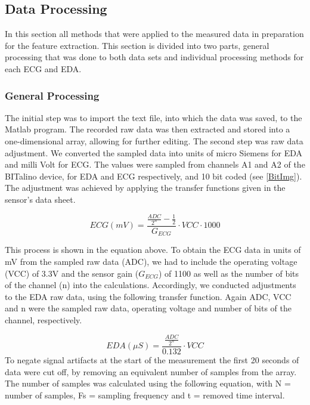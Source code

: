 \subsection{Data Processing}
In this section all methods that were applied to the measured data in preparation for the feature extraction. This section is divided into two parts, general processing that was done to both data sets and individual processing methods for each ECG and EDA.

\subsubsection{General Processing}
The initial step was to import the text file, into which the data was saved, to the Matlab program. The recorded raw data was then extracted and stored into a one-dimensional array, allowing for further editing.
The second step was raw data adjustment. We converted the sampled data into units of micro Siemens for EDA and milli Volt for ECG. The values were sampled from channels A1 and A2 of the BITalino device, for EDA and ECG respectively, and 10 bit coded (see \ref{BitImg}).
The adjustment was achieved by applying the transfer functions given in the sensor's data sheet.

\begin{equation}\label{transfECG}
ECG(mV) = \frac{\frac{ADC}{2^{n}}-\frac{1}{2}}{G_{ECG}} \cdot VCC \cdot 1000 
\end{equation}

This process is shown in the equation above. To obtain the ECG data in units of mV from the sampled raw data (ADC), we had to include the operating voltage (VCC) of 3.3V and the sensor gain ($G_{ECG}$) of 1100 as well as the number of bits of the channel (n) into the calculations.
Accordingly, we conducted adjustments to the EDA raw data, using the following transfer function. Again ADC, VCC and n were the sampled raw data, operating voltage and number of bits of the channel, respectively. 
 
\begin{equation}\label{transfEDA}
EDA (\mu S) = \frac{\frac{ADC}{2^{n}}}{0.132} \cdot VCC
\end{equation}
%
To negate signal artifacts at the start of the measurement the first 20 seconds of data were cut off, by removing an equivalent number of samples from the array. The number of samples was calculated using the following equation, with N = number of samples, Fs = sampling frequency and t = removed time interval.

